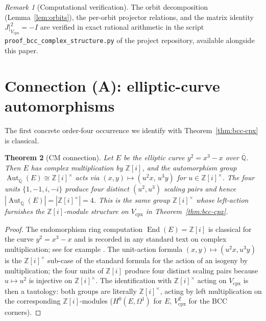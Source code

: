 \documentclass[11pt,reqno]{amsart}
\theoremstyle{plain}
\newtheorem{theorem}{Theorem}[section]
\theoremstyle{definition}
\theoremstyle{remark}
\newtheorem{remark}[theorem]{Remark}
\numberwithin{equation}{section}
\newcommand{\Aut}{\operatorname{Aut}}
\newcommand{\End}{\operatorname{End}}
\newcommand{\Vcpx}{V_{\mathrm{cpx}}}
\begin{document}
\begin{remark}[Computational verification]
\label{rem:verification}
The orbit decomposition (Lemma~\ref{lem:orbits}), the per-orbit
projector relations, and the matrix identity $J|_{\Vcpx}^{2} = -I$
are verified in exact rational arithmetic in the script
\texttt{proof\_bcc\_complex\_structure.py} of the project
repository, available alongside this paper.
\end{remark}

\section{Connection (A): elliptic-curve automorphisms}
\label{sec:cm}

The first concrete order-four occurrence we identify with
Theorem~\ref{thm:bcc-cpx} is classical.

\begin{theorem}[CM connection]
\label{thm:cm}
Let $E$ be the elliptic curve $y^{2} = x^{3} - x$ over
$\overline{\mathbb{Q}}$. Then $E$ has complex multiplication by
$\mathbb{Z}[i]$, and the automorphism group
$\Aut_{\overline{\mathbb{Q}}}(E) \cong \mathbb{Z}[i]^{\times}$
acts via
$(x, y) \mapsto (u^{2} x,\, u^{3} y)$ for $u \in \mathbb{Z}[i]^{\times}$.
The four units $\{1, -1, i, -i\}$ produce four distinct $(u^{2},
u^{3})$ scaling pairs and hence
$|\Aut_{\overline{\mathbb{Q}}}(E)| = |\mathbb{Z}[i]^{\times}| = 4$.
This is the same group $\mathbb{Z}[i]^{\times}$ whose left-action
furnishes the $\mathbb{Z}[i]$-module structure on $\Vcpx$ in
Theorem~\ref{thm:bcc-cpx}.
\end{theorem}

\begin{proof}
The endomorphism ring computation $\End(E) = \mathbb{Z}[i]$ is
classical for the curve $y^{2} = x^{3} - x$ and is recorded in any
standard text on complex multiplication; see for example
\cite[Chapter II, \S 2]{silverman-cm}. The unit-action formula
$(x, y) \mapsto (u^{2} x, u^{3} y)$ is the $\mathbb{Z}[i]^{\times}$
sub-case of the standard formula for the action of an isogeny by
multiplication; the four units of $\mathbb{Z}[i]$ produce four
distinct scaling pairs because $u \mapsto u^{2}$ is injective on
$\mathbb{Z}[i]^{\times}$. The identification with $\mathbb{Z}[i]
^{\times}$ acting on $\Vcpx$ is then a tautology: both groups are
literally $\mathbb{Z}[i]^{\times}$, acting by left multiplication on
the corresponding $\mathbb{Z}[i]$-modules ($H^{0}(E, \Omega^{1})$ for
$E$, $\Vcpx^{\mathbb{Z}}$ for the BCC corners).
\end{proof}
\end{document}
